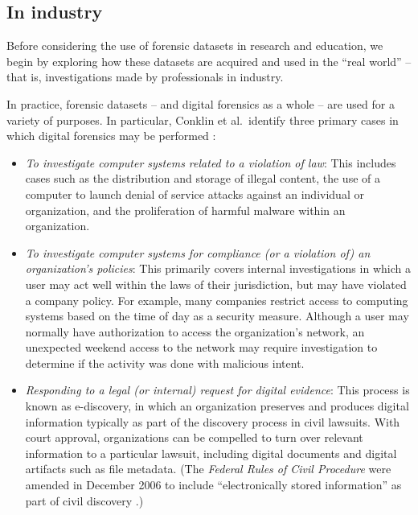 \documentclass[letterpaper,12pt]{report}
\def\tightlist{}
\begin{document}
\subsection{In industry}\label{in-industry}

Before considering the use of forensic datasets in research and
education, we begin by exploring how these datasets are acquired and
used in the ``real world'' -- that is, investigations made by
professionals in industry.

In practice, forensic datasets -- and digital forensics as a whole --
are used for a variety of purposes. In particular, Conklin et
al.~identify three primary cases in which digital forensics may be
performed \cite{conklinComputerForensics2022}:

\begin{itemize}
\tightlist
\item
  \emph{To investigate computer systems related to a violation of law}:
  This includes cases such as the distribution and storage of illegal
  content, the use of a computer to launch denial of service attacks
  against an individual or organization, and the proliferation of
  harmful malware within an organization.
\item
  \emph{To investigate computer systems for compliance (or a violation
  of) an organization's policies}: This primarily covers internal
  investigations in which a user may act well within the laws of their
  jurisdiction, but may have violated a company policy. For example,
  many companies restrict access to computing systems based on the time
  of day as a security measure. Although a user may normally have
  authorization to access the organization's network, an unexpected
  weekend access to the network may require investigation to determine
  if the activity was done with malicious intent.
\item
  \emph{Responding to a legal (or internal) request for digital
  evidence}: This process is known as e-discovery, in which an
  organization preserves and produces digital information typically as
  part of the discovery process in civil lawsuits. With court approval,
  organizations can be compelled to turn over relevant information to a
  particular lawsuit, including digital documents and digital artifacts
  such as file metadata. (The \emph{Federal Rules of Civil Procedure}
  were amended in December 2006 to include ``electronically stored
  information'' as part of civil discovery
  \cite{withersj.ElectronicallyStoredInformation2006}.)
\end{itemize}
\end{document}
